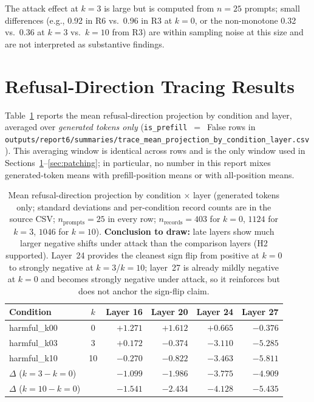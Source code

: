\documentclass{article}
\begin{document}
The attack effect at $k=3$ is large but is computed from $n=25$ prompts;
small differences (e.g., 0.92 in R6 vs.\ 0.96 in R3 at $k=0$, or the
non-monotone 0.32 vs.\ 0.36 at $k=3$ vs.\ $k=10$ from R3) are within
sampling noise at this size and are not interpreted as substantive findings.

\section{Refusal-Direction Tracing Results}
\label{sec:tracing}

Table~\ref{tab:tracing} reports the mean refusal-direction projection by
condition and layer, averaged over \emph{generated tokens only}
(\texttt{is\_prefill}~$=$~False rows in
\texttt{outputs/report6/summaries/trace\_mean\_projection\_by\_condition\_layer.csv}).
This averaging window is identical across rows and is the only window used
in Sections~\ref{sec:tracing}--\ref{sec:patching}; in particular, no number
in this report mixes generated-token means with prefill-position means or
with all-position means.

\begin{table}[h]
\centering
\small
\caption{Mean refusal-direction projection by condition $\times$ layer
(generated tokens only; standard deviations and per-condition record
counts are in the source CSV; $n_{\text{prompts}} = 25$ in every row;
$n_{\text{records}} = 403$ for $k=0$, $1124$ for $k=3$, $1046$ for $k=10$).
\textbf{Conclusion to draw:} late layers show much larger negative shifts
under attack than the comparison layers (H2 supported). Layer~24 provides
the cleanest sign flip from positive at $k=0$ to strongly negative at
$k=3$/$k=10$; layer~27 is already mildly negative at $k=0$ and becomes
strongly negative under attack, so it reinforces but does not anchor the
sign-flip claim.}
\label{tab:tracing}
\begin{tabular}{lcrrrr}
\toprule
Condition & $k$ & Layer 16 & Layer 20 & Layer 24 & Layer 27 \\
\midrule
harmful\_k00  & 0  & $+1.271$ & $+1.612$ & $+0.665$ & $-0.376$ \\
harmful\_k03  & 3  & $+0.172$ & $-0.374$ & $-3.110$ & $-5.285$ \\
harmful\_k10  & 10 & $-0.270$ & $-0.822$ & $-3.463$ & $-5.811$ \\
\midrule
$\Delta$ ($k{=}3 - k{=}0$) &    & $-1.099$ & $-1.986$ & $-3.775$ & $-4.909$ \\
$\Delta$ ($k{=}10 - k{=}0$) &   & $-1.541$ & $-2.434$ & $-4.128$ & $-5.435$ \\
\bottomrule
\end{tabular}
\end{table}
\end{document}
